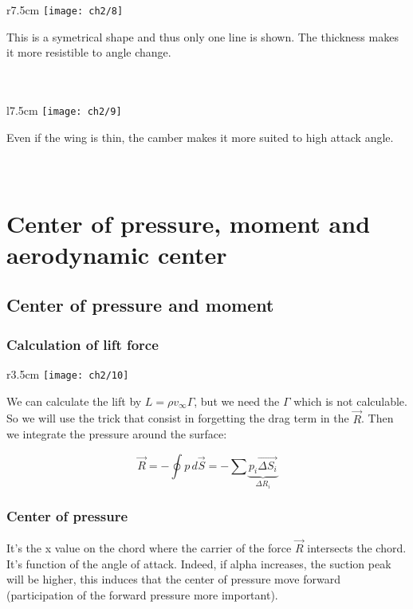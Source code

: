 			\begin{wrapfigure}[2]{r}{7.5cm}
			\vspace{-5mm}
			\texttt{[image: ch2/8]}
			\end{wrapfigure}
			This is a symetrical shape and thus only one line is shown. The thickness makes it more resistible to angle change. \\\\\\
			
			\begin{wrapfigure}[2]{l}{7.5cm}
			\vspace{-5mm}
			\texttt{[image: ch2/9]}
			\end{wrapfigure}
			Even if the wing is thin, the camber makes it more suited to high attack angle. \\\\\\
		
		\section{Center of pressure, moment and aerodynamic center}
			\subsection{Center of pressure and moment}
				\subsubsection{Calculation of lift force}
					\begin{wrapfigure}[12]{r}{3.5cm}
					\vspace{-5mm}
					\texttt{[image: ch2/10]}
					\end{wrapfigure}
					We can calculate the lift by $L = \rho v_\infty \Gamma$, but we need the $\Gamma$ which is not calculable. So we will use the trick that consist in forgetting the drag term in the $\vec{R}$. Then we integrate the pressure around the surface:
					
					\begin{equation}
					\vec{R} = -\oint p \, d\vec{S} = - \sum \underbrace{p_i \vec{\Delta S_i}}_{\Delta R_i}
					\end{equation}
					
				\subsubsection{Center of pressure}
					It's the x value on the chord where the carrier of the force $\vec{R}$ intersects the chord. It's function of the angle of attack. Indeed, if alpha increases, the suction peak will be higher, this induces that the center of pressure move forward (participation of the forward pressure more important).
					
